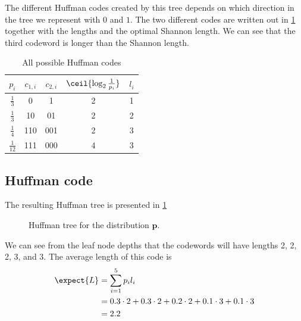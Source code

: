 \documentclass{article}
\begin{document}
The different Huffman codes created by this tree
depends on which direction in the tree we represent with $0$ and $1$.
The two different codes are written out in \cref{tab:huffcodes}
together with the lengths and the optimal Shannon length.
We can see that the third codeword is longer than the Shannon length.
\begin{table}[!ht]
  \centering
  \renewcommand{\arraystretch}{1.2}
  \caption{All possible Huffman codes}
  \begin{tabular}{ccccc}
    $p_i$ & $c_{1,i}$ & $c_{2,i}$ & $\ceil{\log_2\frac{1}{p_i}}$ & $l_i$\\\hline
    $\frac{1}{3}$ & 0 & 1 & 2 & 1 \\
    $\frac{1}{3}$ & 10 & 01 & 2 & 2 \\
    $\frac{1}{4}$ & 110 & 001 & 2 & 3\\
    $\frac{1}{12}$ & 111 & 000 & 4 & 3 
  \end{tabular}
  \label{tab:huffcodes}
\end{table}

\subsection{Huffman code}
The resulting Huffman tree is presented in \cref{fig:hufftree2}
\begin{figure}[!ht]
  \centering
  \caption{Huffman tree for the distribution $\mathbf{p}$.}
  \label{fig:hufftree2}
\end{figure}

We can see from the leaf node depths that the codewords will have lengths 2, 2, 2, 3, and 3.
The average length of this code is
\begin{equation}
  \begin{aligned}
    \expect{L}
    &= \sum_{i=1}^5 p_i l_i \\
    &= 0.3 \cdot 2 + 0.3 \cdot 2 + 0.2 \cdot 2 + 0.1 \cdot 3 + 0.1 \cdot 3 \\
    &= 2.2
  \end{aligned}
\end{equation}
\end{document}
